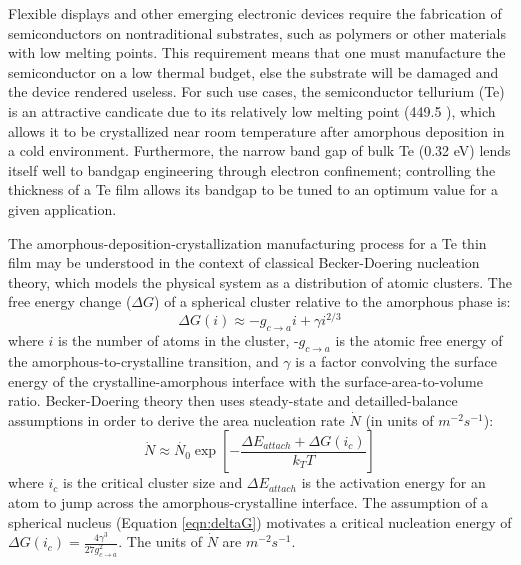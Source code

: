 Flexible displays and other emerging electronic devices require the fabrication of semiconductors on nontraditional substrates, such as polymers or other materials with low melting points.  This requirement means that one must manufacture the semiconductor on a low thermal budget, else the substrate will be damaged and the device rendered useless.  For such use cases, the semiconductor tellurium (Te) is an attractive candicate due to its relatively low melting point (449.5 ), which allows it to be crystallized near room temperature after amorphous deposition in a cold environment.  Furthermore, the narrow band gap of bulk Te (0.32 eV) lends itself well to bandgap engineering through electron confinement; controlling the thickness of a Te film allows its bandgap to be tuned to an optimum value for a given application.

The amorphous-deposition-crystallization manufacturing process for a Te thin film may be understood in the context of classical Becker-Doering nucleation theory, which models the physical system as a distribution of atomic clusters.  The free energy change ($\Delta G$) of a spherical cluster relative to the amorphous phase is:
%
	\begin{equation}
		\Delta G(i) \approx -g_{c \rightarrow a}i + \gamma i^{2/3}
	\label{eqn:deltaG}
	\end{equation}
%
where $i$ is the number of atoms in the cluster, -$g_{c \rightarrow a}$ is the atomic free energy of the amorphous-to-crystalline transition, and $\gamma$ is a factor convolving the surface energy of the crystalline-amorphous interface with the surface-area-to-volume ratio.  Becker-Doering theory then uses steady-state and detailled-balance assumptions in order to derive the area nucleation rate $\dot{N}$ (in units of $m^{-2}s^{-1}$):
%
	\begin{equation}
		\dot{N} \approx \dot{N_0} 
		\exp\left[-\frac{\Delta E_{attach} + \Delta G(i_c)}{k_T T}\right]
	\label{eqn:N_dot}
	\end{equation}
%
where $i_c$ is the critical cluster size and $\Delta E_{attach}$ is the activation energy for an atom to jump across the amorphous-crystalline interface.  The assumption of a spherical nucleus (Equation \ref{eqn:deltaG}) motivates a critical nucleation energy of $\Delta G(i_c) = \frac{4 \gamma^3}{27g_{c \rightarrow a}^2}$.  The units of $\dot{N}$ are $m^{-2}s^{-1}$.

